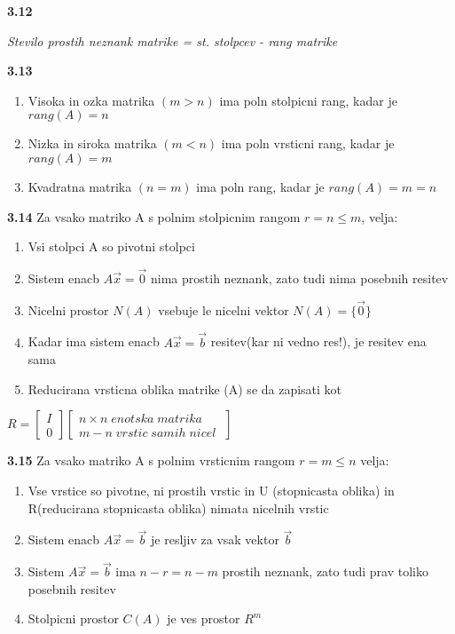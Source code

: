 \documentclass{article}
\begin{document}
\begin{multicols}{4}
\textbf{3.12}
\begin{center}
    \textit{Stevilo prostih neznank matrike = st. stolpcev - rang matrike}   
\end{center}

\textbf{3.13}
\begin{enumerate}
    \item Visoka in ozka matrika $(m > n)$ ima poln stolpicni rang, kadar je $rang(A) = n$
    \item Nizka in siroka matrika $(m < n)$ ima poln vrsticni rang, kadar je $rang(A) = m$
    \item Kvadratna matrika $(n = m)$ ima poln rang, kadar je $rang(A) = m = n$
\end{enumerate}

\textbf{3.14} Za vsako matriko A s polnim stolpicnim rangom $r = n \leq m$, velja:
\begin{enumerate}
    \item Vsi stolpci A so pivotni stolpci
    \item Sistem enacb $A\vec{x} = \vec{0}$ nima prostih neznank, zato tudi nima posebnih resitev
    \item Nicelni prostor $N(A)$ vsebuje le nicelni vektor $N(A) = \{\vec{0}\}$
    \item Kadar ima sistem enacb $A\vec{x} = \vec{b}$ resitev(kar ni vedno res!), je resitev ena sama
    \item Reducirana vrsticna oblika matrike (A) se da zapisati kot
\end{enumerate}
\begin{center}
    $R =
    \begin{bmatrix}
        I\\
        0
    \end{bmatrix}
    \begin{bmatrix}
        n \times n\; enotska\; matrika\\
        m - n\; vrstic\; samih\; nicel\;
    \end{bmatrix}
    $
\end{center}

\textbf{3.15} Za vsako matriko A s polnim vrsticnim rangom $r = m \leq n$ velja:
\begin{enumerate}
    \item Vse vrstice so pivotne, ni prostih vrstic in U (stopnicasta oblika) in R(reducirana stopnicasta oblika) nimata nicelnih vrstic
    \item Sistem enacb $A\vec{x} = \vec{b}$ je resljiv za vsak vektor $\vec{b}$
    \item Sistem $A\vec{x} = \vec{b}$ ima $n-r = n-m$ prostih neznank, zato tudi prav toliko posebnih resitev
    \item Stolpicni prostor $C(A)$ je ves prostor $R^{m}$
\end{enumerate}


\end{multicols}
\end{document}
